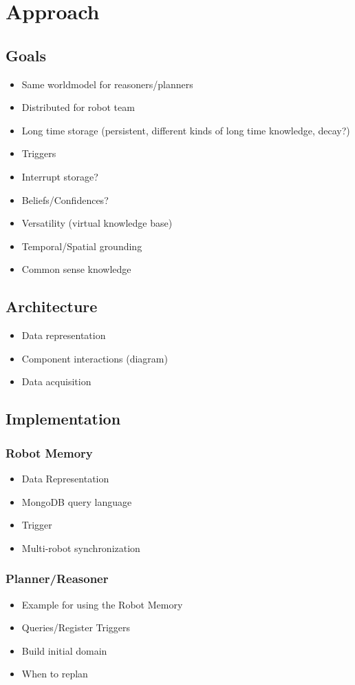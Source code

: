\documentclass[a4paper,11pt]{article}
\begin{document}
\section{Approach}
\subsection{Goals}
\begin{itemize}
\item Same worldmodel for reasoners/planners
\item Distributed for robot team
\item Long time storage (persistent, different kinds of long time knowledge, decay?)
\item Triggers
\item Interrupt storage?
\item Beliefs/Confidences?
\item Versatility (virtual knowledge base)
\item Temporal/Spatial grounding
\item Common sense knowledge
\end{itemize}
\subsection{Architecture}
\begin{itemize}
\item Data representation
\item Component interactions (diagram)
\item Data acquisition
\end{itemize}


\subsection{Implementation}
\subsubsection{Robot Memory}
\begin{itemize}
\item Data Representation
\item MongoDB query language
\item Trigger
\item Multi-robot synchronization
\end{itemize}
\subsubsection{Planner/Reasoner}
\begin{itemize}
\item Example for using the Robot Memory
\item Queries/Register Triggers
\item Build initial domain
\item When to replan
\end{itemize}
\end{document}
